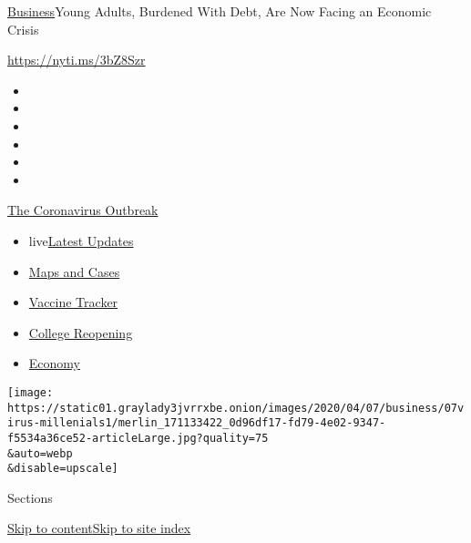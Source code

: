 \href{/section/business}{Business}\textbar{}Young Adults, Burdened With
Debt, Are Now Facing an Economic Crisis

\url{https://nyti.ms/3bZ8Szr}

\begin{itemize}
\item
\item
\item
\item
\item
\item
\end{itemize}

\href{https://www.nytimes3xbfgragh.onion/news-event/coronavirus?action=click\&pgtype=Article\&state=default\&region=TOP_BANNER\&context=storylines_menu}{The
Coronavirus Outbreak}

\begin{itemize}
\tightlist
\item
  live\href{https://www.nytimes3xbfgragh.onion/2020/08/03/world/coronavirus-covid-19.html?action=click\&pgtype=Article\&state=default\&region=TOP_BANNER\&context=storylines_menu}{Latest
  Updates}
\item
  \href{https://www.nytimes3xbfgragh.onion/interactive/2020/us/coronavirus-us-cases.html?action=click\&pgtype=Article\&state=default\&region=TOP_BANNER\&context=storylines_menu}{Maps
  and Cases}
\item
  \href{https://www.nytimes3xbfgragh.onion/interactive/2020/science/coronavirus-vaccine-tracker.html?action=click\&pgtype=Article\&state=default\&region=TOP_BANNER\&context=storylines_menu}{Vaccine
  Tracker}
\item
  \href{https://www.nytimes3xbfgragh.onion/2020/08/02/us/covid-college-reopening.html?action=click\&pgtype=Article\&state=default\&region=TOP_BANNER\&context=storylines_menu}{College
  Reopening}
\item
  \href{https://www.nytimes3xbfgragh.onion/live/2020/08/03/business/stock-market-today-coronavirus?action=click\&pgtype=Article\&state=default\&region=TOP_BANNER\&context=storylines_menu}{Economy}
\end{itemize}

\texttt{[image: https://static01.graylady3jvrrxbe.onion/images/2020/04/07/business/07virus-millenials1/merlin\_171133422\_0d96df17-fd79-4e02-9347-f5534a36ce52-articleLarge.jpg?quality=75\\\&auto=webp\\\&disable=upscale]}

Sections

\protect\hyperlink{site-content}{Skip to
content}\protect\hyperlink{site-index}{Skip to site index}

